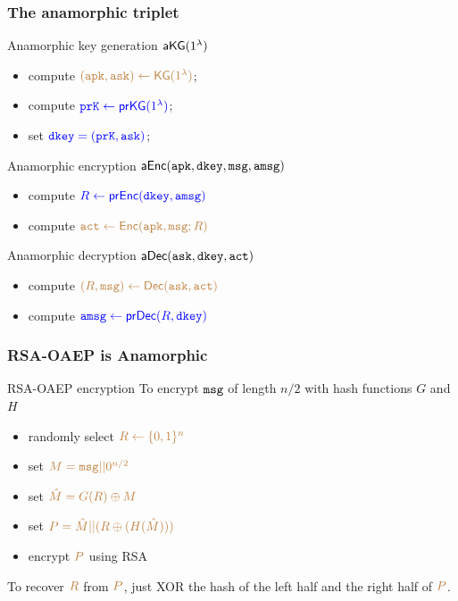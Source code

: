 \documentclass[]{beamer}
\begin{document}
\begin{frame}

\frametitle{The anamorphic triplet}

\begin{exampleblock}{Anamorphic key generation ${\mathsf{a}}{\mathsf{KG}}(1^\lambda)$}
\begin{itemize}
    \item compute $\color{brown}({\mathtt{a}}{\mathtt{pk}},{\mathtt{a}}{\mathtt{sk}})\leftarrow{\mathsf{KG}}(1^\lambda)$;
    \item compute $\color{blue}{\mathtt{pr}}{\mathtt{K}}\leftarrow{\mathsf{pr}}{\mathsf{KG}}(1^\lambda)$;
    \item set $\color{blue}{\mathtt{dkey}}=({\mathtt{pr}}{\mathtt{K}},{\mathtt{a}}{\mathtt{sk}})$;
\end{itemize}
\end{exampleblock}

\begin{exampleblock}{Anamorphic encryption ${\mathsf{a}}{\mathsf{Enc}}({\mathtt{a}}{\mathtt{pk}},{\mathtt{dkey}},{\mathtt{msg}},{\mathtt{a}}{\mathtt{msg}})$}
\begin{itemize}
    \item compute $\color{blue} R\leftarrow{\mathsf{pr}}{\mathsf{Enc}}({\mathtt{dkey}},{\mathtt{a}}{\mathtt{msg}})$
    \item compute $\color{brown} {\mathtt{a}}{\mathtt{ct}}\leftarrow{\mathsf{Enc}}({\mathtt{a}}{\mathtt{pk}},{\mathtt{msg}};R)$
\end{itemize}
\end{exampleblock}

\begin{exampleblock}{Anamorphic decryption ${\mathsf{a}}{\mathsf{Dec}}({\mathtt{a}}{\mathtt{sk}},{\mathtt{dkey}},{\mathtt{a}}{\mathtt{ct}})$}
\begin{itemize}
    \item compute $\color{brown} (R,{\mathtt{msg}})\leftarrow{\mathsf{Dec}}({\mathtt{a}}{\mathtt{sk}},{\mathtt{a}}{\mathtt{ct}})$
    \item compute $\color{blue} {\mathtt{a}}{\mathtt{msg}}\leftarrow{\mathsf{pr}}{\mathsf{Dec}}(R,{\mathtt{dkey}})$
\end{itemize}
\end{exampleblock}
\end{frame}

\begin{frame}
\frametitle{RSA-OAEP is Anamorphic}

\begin{block}{RSA-OAEP encryption}
To encrypt ${\mathtt{msg}}$ of length $n/2$ with hash functions $G$ and $H$
\begin{itemize}
    \item randomly select $\color{brown} R\leftarrow\{0,1\}^n$
    \item set $\color{brown} M={\mathtt{msg}}||0^{n/2}$
    \item set $\color{brown} \hat M=G(R)\oplus M$
    \item set $\color{brown} P=\hat M||(R\oplus(H(\hat M)))$
    \item encrypt $\color{brown} P$ using RSA
\end{itemize}

\vskip 1cm
To recover $\color{brown} R$ from $\color{brown} P$,
just XOR the hash of the left half and the right half of $\color{brown} P$.

\end{block}
\end{frame}
\end{document}
